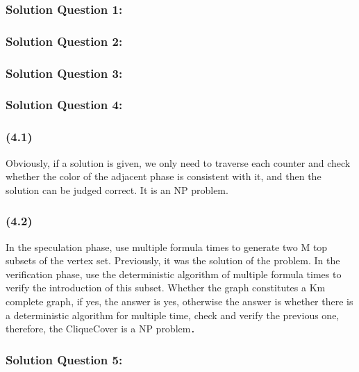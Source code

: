 
\subsubsection{Solution Question 1:} 

\subsubsection{Solution Question 2:} 

\subsubsection{Solution Question 3:} 

\subsubsection{Solution Question 4:} 
\subsubsection{(4.1)} Obviously, if a solution is given, we only need to traverse each counter and check whether the color of the adjacent phase is consistent with it, and then the solution can be judged correct. It is an NP problem.
\subsubsection{(4.2)} In the speculation phase, use multiple formula times to generate two M top subsets of the vertex set. Previously, it was the solution of the problem. In the verification phase, use the deterministic algorithm of multiple formula times to verify the introduction of this subset. Whether the graph constitutes a Km complete graph, if yes, the answer is yes, otherwise the answer is whether there is a deterministic algorithm for multiple time, check and verify the previous one, therefore, the CliqueCover is a NP problem．

\subsubsection{Solution Question 5:} 
